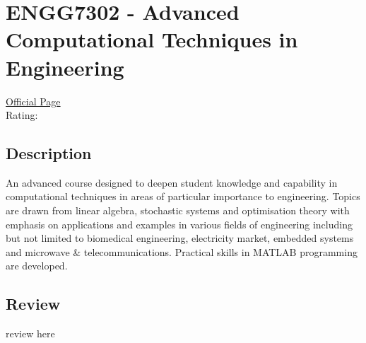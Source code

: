 \hypertarget{ENGG7302}{\section{ENGG7302 - Advanced Computational Techniques in Engineering}}

\large
\textcolor{turbo_purple}{\href{https://my.uq.edu.au/programs-courses/course.html?course_code=ENGG7302}{Official Page}} \\
Rating: \cstar\cstar\cstar\cstar\ostar

\normalsize
\subsection*{Description}
An advanced course designed to deepen student knowledge and capability in computational techniques in areas of particular importance to engineering.
Topics are drawn from linear algebra, stochastic systems and optimisation theory with emphasis on applications and examples in various fields of engineering including but not limited to biomedical engineering, electricity market, embedded systems and microwave \& telecommunications.
Practical skills in MATLAB programming are developed.

\subsection*{Review}
review here
